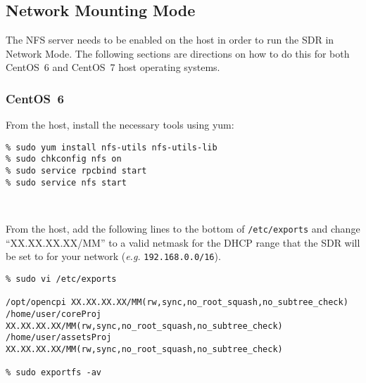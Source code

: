 \iffalse
This file is protected by Copyright. Please refer to the COPYRIGHT file
distributed with this source distribution.

This file is part of OpenCPI <http://www.opencpi.org>

OpenCPI is free software: you can redistribute it and/or modify it under the
terms of the GNU Lesser General Public License as published by the Free Software
Foundation, either version 3 of the License, or (at your option) any later
version.

OpenCPI is distributed in the hope that it will be useful, but WITHOUT ANY
WARRANTY; without even the implied warranty of MERCHANTABILITY or FITNESS FOR A
PARTICULAR PURPOSE. See the GNU Lesser General Public License for more details.

You should have received a copy of the GNU Lesser General Public License along
with this program. If not, see <http://www.gnu.org/licenses/>.
\fi

\newlength{\savedparindentnfs}%
\setlength{\savedparindentnfs}{\parindent}%
\setlength{\parindent}{0pt} %
\providecommand{\forceindent}{\leavevmode{\parindent=1em\indent}}%

\subsection{Network Mounting Mode}
\label{sec:network_mode}
The NFS server needs to be enabled on the host in order to run the SDR in Network Mode. The following sections are directions on how to do this for both CentOS~6 and CentOS~7 host operating systems.
\subsubsection{CentOS~6}
\begin{minipage}{\linewidth}
From the host, install the necessary tools using yum:
\begin{verbatim}
% sudo yum install nfs-utils nfs-utils-lib
% sudo chkconfig nfs on
% sudo service rpcbind start
% sudo service nfs start
\end{verbatim}
\end{minipage}
~\\

\begin{minipage}{\linewidth}
From the host, add the following lines to the bottom of \texttt{/etc/exports} and change ``XX.XX.XX.XX/MM'' to a valid netmask for the DHCP range that the SDR will be set to for your network (\textit{e.g.} \texttt{192.168.0.0/16}).
\begin{verbatim}
% sudo vi /etc/exports

/opt/opencpi XX.XX.XX.XX/MM(rw,sync,no_root_squash,no_subtree_check)
/home/user/coreProj XX.XX.XX.XX/MM(rw,sync,no_root_squash,no_subtree_check)
/home/user/assetsProj XX.XX.XX.XX/MM(rw,sync,no_root_squash,no_subtree_check)

% sudo exportfs -av
\end{verbatim}
\end{minipage}
~\\


